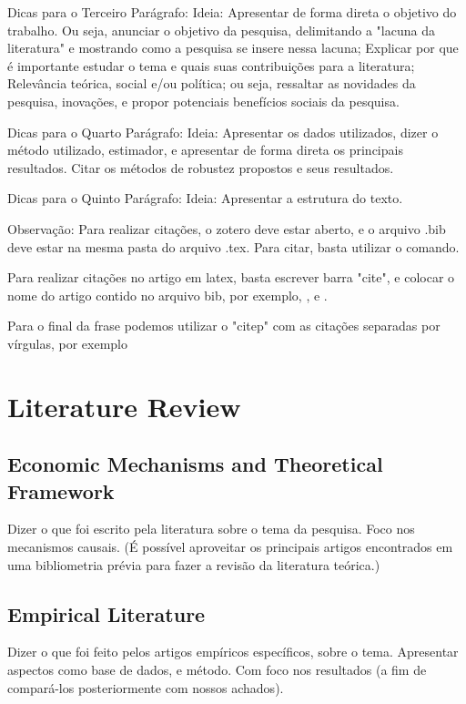 \documentclass[a4paper]{article}
\begin{document}
Dicas para o Terceiro Parágrafo: Ideia: Apresentar de forma direta o objetivo do trabalho. Ou seja, anunciar o objetivo da pesquisa, delimitando a "lacuna da literatura" e mostrando como a pesquisa se insere nessa lacuna; Explicar por que é importante estudar o tema e quais suas contribuições para a literatura; Relevância teórica, social e/ou política; ou seja, ressaltar as novidades da pesquisa, inovações, e propor potenciais benefícios sociais da pesquisa.

Dicas para o Quarto Parágrafo: Ideia: Apresentar os dados utilizados, dizer o método utilizado, estimador, e apresentar de forma direta os principais resultados. Citar os métodos de robustez propostos e seus resultados.

Dicas para o Quinto Parágrafo: Ideia: Apresentar a estrutura do texto.

Observação: Para realizar citações, o zotero deve estar aberto, e o arquivo .bib deve estar na mesma pasta do arquivo .tex. Para citar, basta utilizar o comando.

Para realizar citações no artigo em latex, basta escrever barra "cite", e colocar o nome do artigo contido no arquivo bib, por exemplo, \cite{hadash2018estimate}, \cite{kour2014fast} e \cite{kour2014real}.

Para o final da frase podemos utilizar o "citep" com as citações separadas por vírgulas, por exemplo \citep{hadash2018estimate, kour2014fast}



\section{Literature Review}

\subsection{Economic Mechanisms and Theoretical Framework}

Dizer o que foi escrito pela literatura sobre o tema da pesquisa. Foco nos mecanismos causais. (É possível aproveitar os principais artigos encontrados em uma bibliometria prévia para fazer a revisão da literatura teórica.)

\subsection{Empirical Literature}

Dizer o que foi feito pelos artigos empíricos específicos, sobre o tema. Apresentar aspectos como base de dados, e método. Com foco nos resultados (a fim de compará-los posteriormente com nossos achados).
\end{document}
